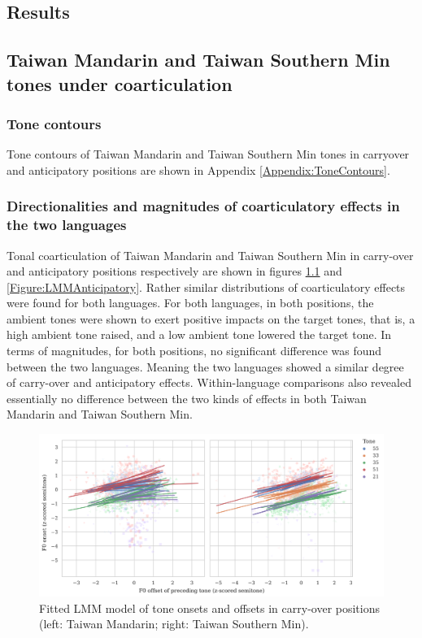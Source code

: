 \documentclass[12pt]{report}
\begin{document}
\begin{CJK}{UTF8}{bsmi}
\pagebreak
\chapter{Results}
\section{Taiwan Mandarin and Taiwan Southern Min tones under coarticulation}

\subsection{Tone contours}

Tone contours of Taiwan Mandarin and Taiwan Southern Min tones in carryover and anticipatory positions are shown in Appendix \ref{Appendix:ToneContours}.

\subsection{Directionalities and magnitudes of coarticulatory effects in the two languages}

Tonal coarticulation of Taiwan Mandarin and Taiwan Southern Min in carry-over and anticipatory positions respectively are shown in figures \ref{Figure:LMMCarryover} and \ref{Figure:LMMAnticipatory}. Rather similar distributions of coarticulatory effects were found for both languages. For both languages, in both positions, the ambient tones were shown to exert positive impacts on the target tones, that is, a high ambient tone raised, and a low ambient tone lowered the target tone. In terms of magnitudes, for both positions, no significant difference was found between the two languages. Meaning the two languages showed a similar degree of carry-over and anticipatory effects. Within-language comparisons also revealed essentially no difference between the two kinds of effects in both Taiwan Mandarin and Taiwan Southern Min.

\begin{figure}[hbt!]
\centering
\includegraphics[width=\textwidth, trim={0 .5cm 0 0}]{Figures/E1/Carryover_lang_seperated.png}
\caption{Fitted LMM model of tone onsets and offsets in carry-over positions (left: Taiwan Mandarin; right: Taiwan Southern Min).}
\label{Figure:LMMCarryover}
\end{figure}


\end{CJK}
\end{document}
